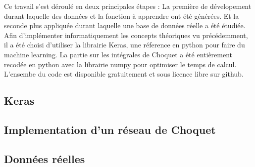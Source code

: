 Ce travail s'est déroulé en deux principales étapes :
La première de dévelopement durant laquelle des données et la fonction à apprendre ont été générées.
Et la seconde plus appliquée durant laquelle une base de données réelle a été étudiée.\\


Afin d'implémenter informatiquement les concepts théoriques vu précédemment,
il a été choisi d'utiliser la librairie Keras\cite{keras}, une réference en python pour faire du machine learning.
La partie sur les intégrales de Choquet a été entièrement recodée en python
avec la librairie numpy\cite{numpy} pour optimiser le temps de calcul.
L'ensembe du code est disponible gratuitement et sous licence libre sur github\cite{repoStage}.

\subsection{Keras}\label{subsec:keras}


\newpage
\subsection{Implementation d'un réseau de Choquet}\label{subsec:implementation-Choquet}


\newpage
\subsection{Données réelles}\label{subsec:données-réelles}


